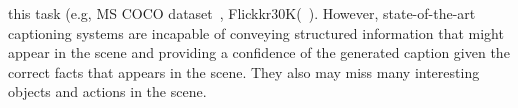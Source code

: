 \documentclass[runningheads]{llncs}
\begin{document}
this task (e.g, MS COCO dataset~\cite{lin2014microsoft}, Flickkr30K(~\cite{young2014image}).  However, state-of-the-art captioning systems are incapable of conveying structured information that might appear in the scene and providing a confidence of the generated caption given the correct facts that appears in the scene.  They also may miss many interesting objects and actions in the scene. %
\end{document}
